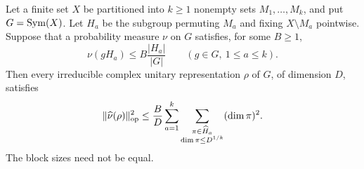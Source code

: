 \begin{proposition}
\label{prop:lift:orbit-sum}
Let a finite set \(X\) be partitioned into \(k\ge1\) nonempty sets
\(M_1,\ldots,M_k\), and put \(G=\operatorname{Sym}(X)\). Let \(H_a\) be the subgroup
permuting \(M_a\) and fixing \(X\setminus M_a\) pointwise. Suppose that a
probability measure \(\nu\) on \(G\) satisfies, for some \(B\ge 1\),
\begin{equation}
\label{eq:lift:coset-cap}
  \nu(gH_a)\le B\frac{|H_a|}{|G|}
  \qquad(g\in G,\ 1\le a\le k).
\end{equation}
Then every irreducible complex unitary representation \(\rho\) of \(G\), of
dimension \(D\), satisfies
\begin{equation}
\label{eq:lift:orbit-sum}
  \|\widehat\nu(\rho)\|_{\mathrm{op}}^2
  \le \frac{B}{D}\sum_{a=1}^k
       \sum_{\substack{\pi\in\widehat H_a\\\dim\pi\le D^{1/k}}}
                    (\dim\pi)^2.
\end{equation}
The block sizes need not be equal.
\end{proposition}


